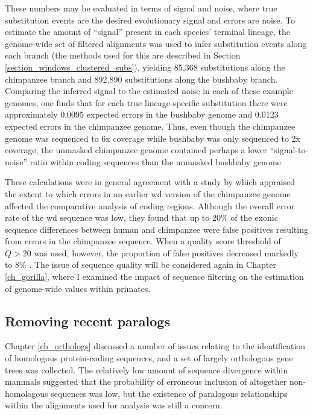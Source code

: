These numbers may be evaluated in terms of signal and noise, where
true substitution events are the desired evolutionary signal and
errors are noise. To estimate the amount of ``signal'' present in each
species' terminal lineage, the genome-wide set of filtered alignments
was used to infer substitution events along each branch (the methods
used for this are described in Section
\ref{section_windows_clustered_subs}), yielding 85,368 substitutions
along the chimpanzee branch and 892,890 substitutions along the
bushbaby branch. Comparing the inferred signal to the estimated noise
in each of these example genomes, one finds that for each true
lineage-specific substitution there were approximately 0.0095 expected
errors in the bushbaby genome and 0.0123 expected errors in the
chimpanzee genome. Thus, even though the chimpanzee genome was
sequenced to 6x coverage while bushbaby was only sequenced to 2x
coverage, the unmasked chimpanzee genome contained perhaps a lower
``signal-to-noise'' ratio within coding sequences than the unmasked
bushbaby genome.

These calculations were in general agreement with a study by
\citet{Taudien2006} which appraised the extent to which errors in an
earlier \ac{wd} version of the chimpanzee genome affected the
comparative analysis of coding regions. Although the overall error
rate of the \ac{wd} sequence was low, they found that up to 20\% of
the exonic sequence differences between human and chimpanzee were
false positives resulting from errors in the chimpanzee sequence. When
a quality score threshold of $Q>20$ was used, however, the proportion
of false positives decreased markedly to 8\% \citep{Taudien2006}. The
issue of sequence quality will be considered again in Chapter
\ref{ch_gorilla}, where I examined the impact of sequence filtering on
the estimation of genome-wide \dnds values within primates.

\subsection{Removing recent paralogs}
\label{sec_removing_paralogs}


Chapter \ref{ch_orthologs} discussed a number of issues relating to
the identification of homologous protein-coding sequences, and a set
of largely orthologous gene trees was collected. The relatively low
amount of sequence divergence within mammals suggested that the
probability of erroneous inclusion of altogether non-homologous
sequences was low, but the existence of paralogous relationships
within the alignments used for \sw analysis was still a concern.

